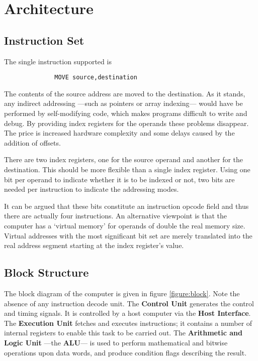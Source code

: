\chapter{Architecture}

\section{Instruction Set}

The single instruction supported is
{\bf
\begin{verbatim}
 	          MOVE source,destination
\end{verbatim}
}
The contents of the source address are moved to the destination.
As it stands, any indirect addressing ---such as pointers or array indexing--- would have be performed by self-modifying code, 
which makes programs difficult to write and debug.
 By providing index registers for the operands these problems disappear. The 
price is  increased hardware complexity and some delays caused 
by the addition of offsets.

There are two index registers, one for the source operand and another for the destination. This should be more flexible than a single index register.
Using one bit per operand to indicate whether it is to be 
indexed or not, two bits are needed per instruction to indicate the 
addressing modes. 

It can  be argued that these bits constitute 
an instruction opcode field  and thus there are actually four 
instructions. An alternative viewpoint is that the computer has a 
`virtual memory' for operands of double the real memory size. 
Virtual addresses with the most significant bit set are merely translated into the real address segment starting at the index register's value.

\section{Block Structure}

The block diagram of the computer is given in figure \ref{figure:block}. Note the 
absence of any instruction decode unit. The {\bf Control Unit} generates 
 the control and timing signals. It  is controlled by 
a host computer via the {\bf Host Interface}. 
The {\bf Execution Unit} fetches and 
executes instructions; it contains a number of internal registers 
to enable this task to be carried out. 
The {\bf Arithmetic and Logic Unit} ---the {\bf ALU}--- is used to perform  mathematical and bitwise operations upon data words, and produce condition flags 
describing the result.

